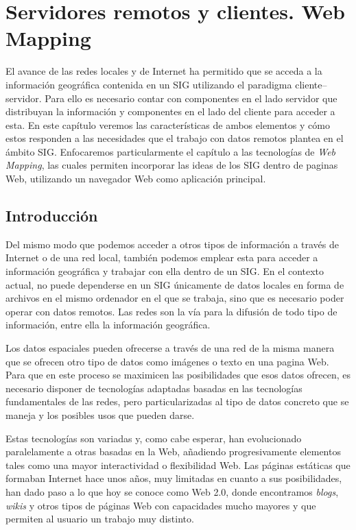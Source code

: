 \pagestyle{fancy}
\chapter{Servidores remotos y clientes. Web Mapping}
\label{Servidores_y_clientes_remotos}


\bigskip

\begin{intro}
El avance de las redes locales y de Internet ha permitido que se acceda a la información geográfica contenida en un SIG utilizando el paradigma cliente--servidor. Para ello es necesario contar con componentes en el lado servidor que distribuyan la información y componentes en el lado del cliente para acceder a esta. En este capítulo veremos las características de ambos elementos y cómo estos responden a las necesidades que el trabajo con datos remotos plantea en el ámbito SIG. Enfocaremos particularmente el capítulo a las tecnologías de \emph{Web Mapping}, las cuales permiten incorporar las ideas de los SIG dentro de paginas Web, utilizando un navegador Web como aplicación principal. 
\end{intro}

\section{Introducción}

Del mismo modo que podemos acceder a otros tipos de información a través de Internet o de una red local, también podemos emplear esta para acceder a información geográfica y trabajar con ella dentro de un SIG. En el contexto actual, no puede dependerse en un SIG únicamente de datos locales en forma de archivos en el mismo ordenador en el que se trabaja, sino que es necesario poder operar con datos remotos. Las redes son la vía para la difusión de todo tipo de información, entre ella la información geográfica.

Los datos espaciales pueden ofrecerse a través de una red de la misma manera que se ofrecen otro tipo de datos como imágenes o texto en una pagina Web. Para que en este proceso se maximicen las posibilidades que esos datos ofrecen, es necesario disponer de tecnologías adaptadas basadas en las tecnologías fundamentales de las redes, pero particularizadas al tipo de datos concreto que se maneja y los posibles usos que pueden darse.

Estas tecnologías son variadas y, como cabe esperar, han evolucionado paralelamente a otras basadas en la Web, añadiendo progresivamente elementos tales como una mayor interactividad o flexibilidad Web. Las páginas estáticas que formaban Internet hace unos años, muy limitadas en cuanto a sus posibilidades, han dado paso a lo que hoy se conoce como Web 2.0, donde encontramos \emph{blogs}, \emph{wikis} y otros tipos de páginas Web con capacidades mucho mayores y que permiten al usuario un trabajo muy distinto.

